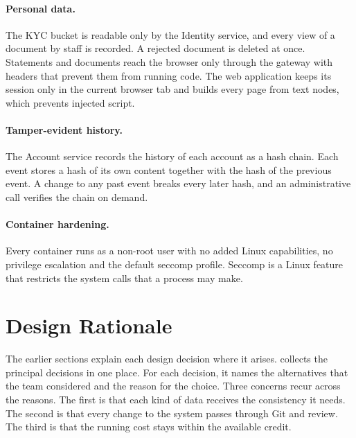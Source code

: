 \documentclass[11pt,a4paper]{article}
\begin{document}
\paragraph{Personal data.} The KYC bucket is readable only by the Identity service, and every view of a document by staff is recorded. A rejected document is deleted at once. Statements and documents reach the browser only through the gateway with headers that prevent them from running code. The web application keeps its session only in the current browser tab and builds every page from text nodes, which prevents injected script.

\paragraph{Tamper-evident history.} The Account service records the history of each account as a hash chain. Each event stores a hash of its own content together with the hash of the previous event. A change to any past event breaks every later hash, and an administrative call verifies the chain on demand.

\paragraph{Container hardening.} Every container runs as a non-root user with no added Linux capabilities, no privilege escalation and the default seccomp profile. Seccomp is a Linux feature that restricts the system calls that a process may make.

\section{Design Rationale}
\label{sec:rationale}

The earlier sections explain each design decision where it arises.  collects the principal decisions in one place. For each decision, it names the alternatives that the team considered and the reason for the choice. Three concerns recur across the reasons. The first is that each kind of data receives the consistency it needs. The second is that every change to the system passes through Git and review. The third is that the running cost stays within the available credit.
\end{document}
